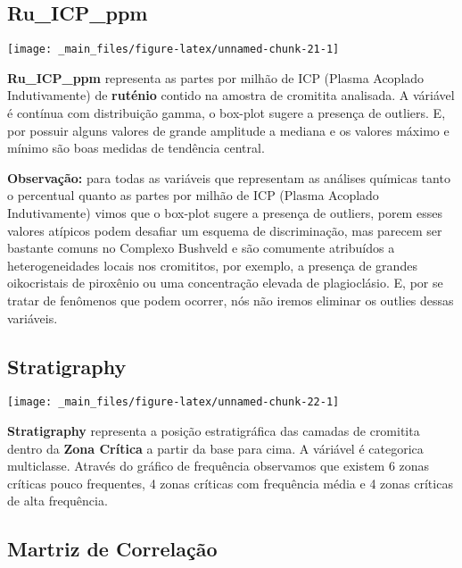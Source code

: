 \documentclass[
]{article}
\begin{document}
\hypertarget{ru_icp_ppm}{%
\subsection{Ru\_ICP\_ppm}\label{ru_icp_ppm}}

\begin{center}\texttt{[image: \_main\_files/figure-latex/unnamed-chunk-21-1]} \end{center}

\textbf{Ru\_ICP\_ppm} representa as partes por milhão de ICP (Plasma Acoplado Indutivamente) de \textbf{ruténio} contido na amostra de cromitita analisada. A váriável é contínua com distribuição gamma, o box-plot sugere a presença de outliers. E, por possuir alguns valores de grande amplitude a mediana e os valores máximo e mínimo são boas medidas de tendência central.

\textbf{Observação:} para todas as variáveis que representam as análises químicas tanto o percentual quanto as partes por milhão de ICP (Plasma Acoplado Indutivamente) vimos que o box-plot sugere a presença de outliers, porem esses valores atípicos podem desafiar um esquema de discriminação, mas parecem ser bastante comuns no Complexo Bushveld e são comumente atribuídos a heterogeneidades locais nos cromititos, por exemplo, a presença de grandes oikocristais de piroxênio ou uma concentração elevada de plagioclásio. E, por se tratar de fenômenos que podem ocorrer, nós não iremos eliminar os outlies dessas variáveis.

\hypertarget{stratigraphy}{%
\subsection{Stratigraphy}\label{stratigraphy}}

\begin{center}\texttt{[image: \_main\_files/figure-latex/unnamed-chunk-22-1]} \end{center}

\textbf{Stratigraphy} representa a posição estratigráfica das camadas de cromitita dentro da \textbf{Zona Crítica} a partir da base para cima. A váriável é categorica multiclasse. Através do gráfico de frequência observamos que existem 6 zonas críticas pouco frequentes, 4 zonas críticas com frequência média e 4 zonas críticas de alta frequência.

\hypertarget{martriz-de-correlauxe7uxe3o}{%
\subsection{Martriz de Correlação}\label{martriz-de-correlauxe7uxe3o}}
\end{document}
